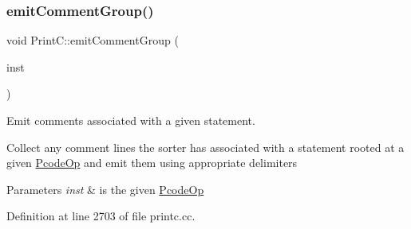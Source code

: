 \subsubsection{\texorpdfstring{emitCommentGroup()}{emitCommentGroup()}}
{\footnotesize\ttfamily void Print\+C\+::emit\+Comment\+Group (\begin{DoxyParamCaption}\item[{const \mbox{\hyperlink{class_pcode_op}{Pcode\+Op}} $\ast$}]{inst }\end{DoxyParamCaption})\hspace{0.3cm}{\ttfamily [protected]}}



Emit comments associated with a given statement. 

Collect any comment lines the sorter has associated with a statement rooted at a given \mbox{\hyperlink{class_pcode_op}{Pcode\+Op}} and emit them using appropriate delimiters 
\begin{DoxyParams}{Parameters}
{\em inst} & is the given \mbox{\hyperlink{class_pcode_op}{Pcode\+Op}} \\
\hline
\end{DoxyParams}


Definition at line 2703 of file printc.\+cc.

